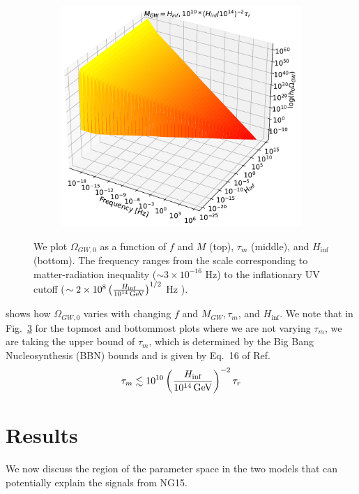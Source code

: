 \documentclass[prd,twocolumn,aps,psfig,nofootinbib,nobibnotes,superscriptaddress,preprintnumbers,times]{revtex4-2}
\newcommand{\GeV}{\,{\rm GeV}}
\begin{document}
\begin{figure}[ht!]
\begin{subfigure}{.5\textwidth}
  \label{fig:contour-b}
\end{subfigure}
\begin{subfigure}{.5\textwidth}
  \centering
  \includegraphics[width=.82\linewidth]{fig/fig4c.pdf}  
  \label{fig:contour-c}
\end{subfigure}
\caption{We plot $\Omega_{GW,0}$ as a function of $f$ and $M$ (top), $\tau_m$ (middle), and $H_{\inf}$ (bottom). The frequency ranges from the scale corresponding to matter-radiation inequality ($\sim 3\times10^{-16}$ Hz) to the inflationary UV cutoff ($\sim 2\times 10^8\left(\frac{H_{\inf}}{10^{14} \GeV}\right)^{1/2}$ Hz \cite{Fujita:2018}). } 
\label{fig:contours}
\end{figure}
\hspace{-1em}shows how $\Omega_{GW,0}$ varies with changing $f$ and $M_{GW}, \tau_m$, and $H_{\inf}$. We note that in Fig.\ \ref{fig:contours} for the topmost and bottommost plots where we are not varying $\tau_m$, we are taking the upper bound of $\tau_m$, which is determined by the Big Bang Nucleosynthesis (BBN) bounds and is given by Eq.\ 16 of Ref.\ \cite{Fujita:2018}
\begin{equation}\label{eqn:tau_m_bbn}
    \tau_m \lesssim 10^{10}\left(\frac{H_{\inf}}{10^{14} \GeV}\right)^{-2}\tau_r
\end{equation}

\section{Results}\label{sec:results}
We now discuss the region of the parameter space in the two models that can potentially explain the signals from NG15. 
\end{document}
